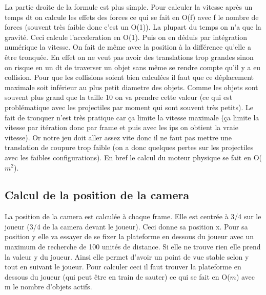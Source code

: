 \documentclass[11pt]{article}
\begin{document}
\indent La partie droite de la formule est plus simple. Pour calculer la vitesse après un temps dt on calcule les effets des forces ce qui se fait en O(f) avec f le nombre de forces (souvent très faible donc c'est un O(1)). La plupart du temps on n'a que la gravité. Ceci calcule l'acceleration en O(1). Puis on en déduis par intégration numérique la vitesse. On fait de même avec la position à la différence qu'elle a être tronquée. En effet on ne veut pas avoir des translations trop grandes sinon on risque en un dt de traverser un objet sans même se rendre compte qu'il y a eu collision. Pour que les collisions soient bien calculées il faut que ce déplacement maximale soit inférieur au plus petit diametre des objets. Comme les objets sont souvent plus grand que la taille 10 on va prendre cette valeur (ce qui est problématique avec les projectiles par moment qui sont souvent très petits). Le fait de tronquer n'est très pratique car ça limite la vitesse maximale (ça limite la vitesse par itération donc par frame et puis avec les ips on obtient la vraie vitesse). Or notre jeu doit aller assez vite donc il ne faut pas mettre une translation de coupure trop faible (on a donc quelques pertes sur les projectiles avec les faibles configurations).
\indent En bref le calcul du moteur physique se fait en O($m^2$).
\subsection{Calcul de la position de la camera}
La position de la camera est calculée à chaque frame. Elle est centrée à 3/4 sur le joueur (3/4 de la camera devant le joueur). Ceci donne sa position x. Pour sa position y elle va essayer de se fixer la plateforme en dessous du joueur avec un maximum de recherche de 100 unités de distance. Si elle ne trouve rien elle prend la valeur y du joueur. Ainsi elle permet d'avoir un point de vue stable selon y tout en suivant le joueur. Pour calculer ceci il faut trouver la plateforme en dessous du joueur (qui peut être en train de sauter) ce qui se fait en O($m$) avec m le nombre d'objets actifs.
\end{document}
